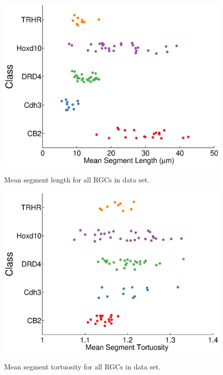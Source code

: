 \documentclass{article}
\begin{document}
\begin{figure}
  \centering
  {\includegraphics[scale=0.75]{Figures/SupFig3/plotFeatures-meanSegmentLength.eps}}
  \caption{Mean segment length for all RGCs in data set.}
\end{figure}


\begin{figure}
  \centering
  {\includegraphics[scale=0.75]{Figures/SupFig3/plotFeatures-meanSegmentTortuosity.eps}}
  \caption{Mean segment tortuosity for all RGCs in data set.}
\end{figure}

\clearpage
\end{document}
